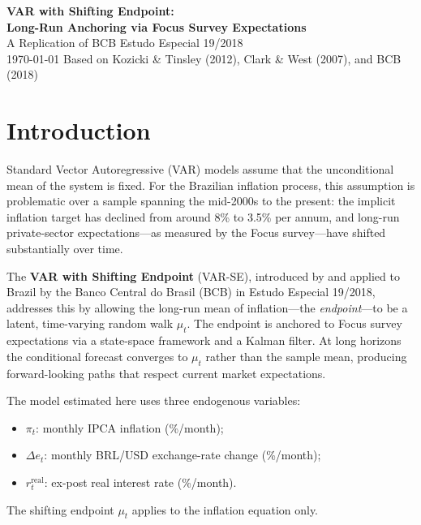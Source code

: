 \documentclass[12pt, a4paper]{article}
\begin{document}
\begin{titlepage}
    \centering
    \vspace*{2cm}
    {\LARGE \textbf{VAR with Shifting Endpoint:} \\[0.4em]
    \textbf{Long-Run Anchoring via Focus Survey Expectations}} \\[1.5cm]
    {\large A Replication of BCB Estudo Especial 19/2018} \\[2cm]
    {\large \today}
    \vfill
    {\small Based on Kozicki \& Tinsley (2012), Clark \& West (2007), and BCB (2018)}
\end{titlepage}

\tableofcontents
\newpage

\section{Introduction}

Standard Vector Autoregressive (VAR) models assume that the unconditional mean
of the system is fixed. For the Brazilian inflation process, this assumption is
problematic over a sample spanning the mid-2000s to the present: the implicit
inflation target has declined from around 8\% to 3.5\% per annum, and long-run
private-sector expectations---as measured by the Focus survey---have shifted
substantially over time.

The \textbf{VAR with Shifting Endpoint} (VAR-SE), introduced by
\citet{kozicki2012} and applied to Brazil by the Banco Central do Brasil (BCB)
in Estudo Especial 19/2018, addresses this by allowing the long-run mean of
inflation---the \emph{endpoint}---to be a latent, time-varying random walk
$\mu_t$. The endpoint is anchored to Focus survey expectations via a
state-space framework and a Kalman filter. At long horizons the conditional
forecast converges to $\mu_t$ rather than the sample mean, producing
forward-looking paths that respect current market expectations.

The model estimated here uses three endogenous variables:
\begin{itemize}
    \item $\pi_t$: monthly IPCA inflation (\%/month);
    \item $\Delta e_t$: monthly BRL/USD exchange-rate change (\%/month);
    \item $r_t^{\mathrm{real}}$: ex-post real interest rate (\%/month).
\end{itemize}
The shifting endpoint $\mu_t$ applies to the inflation equation only.
\end{document}
